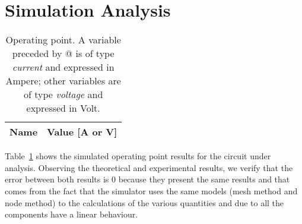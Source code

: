 \section{Simulation Analysis}
\label{sec:simulation}


\begin{table}[h]
  \centering
  \begin{tabular}{|l|r|}
    \hline    
    {\bf Name} & {\bf Value [A or V]} \\ \hline
    
  \end{tabular}
  \caption{Operating point. A variable preceded by @ is of type {\em current}
    and expressed in Ampere; other variables are of type {\it voltage} and expressed in
    Volt.}
  \label{tab:tabela3}
\end{table}



Table~\ref{tab:tabela3} shows the simulated operating point results for the circuit
under analysis.
Observing the theoretical and experimental results, we verify that the error between both results is 0 because 
they present the same results and that comes from the fact that the simulator uses the same models (mesh method and node method) to the calculations of the various quantities and
due to all the components have a linear behaviour. 



